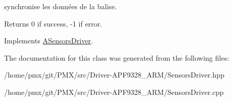 synchronise les données de la balise. 

\begin{DoxyReturn}{Returns}
0 if success, -\/1 if error. 
\end{DoxyReturn}


Implements \hyperlink{classASensorsDriver_a0c581029ba10d5ac820a9e3e2e6883cd}{A\+Sensors\+Driver}.



The documentation for this class was generated from the following files\+:\begin{DoxyCompactItemize}
\item 
/home/pmx/git/\+P\+M\+X/src/\+Driver-\/\+A\+P\+F9328\+\_\+\+A\+R\+M/Sensors\+Driver.\+hpp\item 
/home/pmx/git/\+P\+M\+X/src/\+Driver-\/\+A\+P\+F9328\+\_\+\+A\+R\+M/Sensors\+Driver.\+cpp\end{DoxyCompactItemize}
